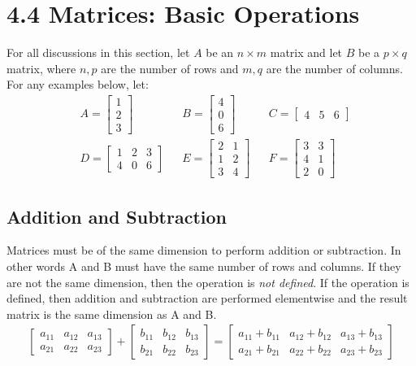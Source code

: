 \documentclass[14pt]{extarticle}
\begin{document}
\section*{4.4 Matrices: Basic Operations}
For all discussions in this section, let $A$ be an $n\times m$ matrix and let $B$ be a $p\times q$ matrix, where $n, p$ are the number of rows and $m, q$ are the number of columns. For any examples below, let:
\begin{align*}
	&A = \begin{bmatrix}
		1 \\
		2 \\
		3
	\end{bmatrix} &
	&B = \begin{bmatrix}
		4 \\
		0 \\
		6
	\end{bmatrix} &
	&C =\begin{bmatrix}
		4 & 5 & 6
	\end{bmatrix} \\
	&D = \begin{bmatrix}
		1 & 2 & 3 \\
		4 & 0 & 6
	\end{bmatrix} &
	&E = \begin{bmatrix}
		2 & 1 \\
		1 & 2 \\
		3 & 4
	\end{bmatrix} &
	&F = \begin{bmatrix}
		3 & 3 \\
		4 & 1 \\
		2 & 0
	\end{bmatrix}
\end{align*}

\subsection{Addition and Subtraction}
Matrices must be of the same dimension to perform addition or subtraction. In other words A and B must have the same number of rows and columns. If they are not the same dimension, then the operation is \textit{not defined}. If the operation is defined, then addition and subtraction are performed elementwise and the result matrix is the same dimension as A and B.
\begin{align*}
	\begin{bmatrix}
		a_{1 1} & a_{1 2} & a_{1 3} \\
		a_{2 1} & a_{2 2} & a_{2 3}
	\end{bmatrix} + 
	\begin{bmatrix}
		b_{1 1} & b_{1 2} & b_{1 3} \\
		b_{2 1} & b_{2 2} & b_{2 3}
	\end{bmatrix} = 
	\begin{bmatrix}
		a_{1 1}+b_{1 1} & a_{1 2}+b_{1 2} & a_{1 3}+b_{1 3} \\
		a_{2 1}+b_{2 1} & a_{2 2}+b_{2 2} & a_{2 3}+b_{2 3}
	\end{bmatrix}
\end{align*}
\end{document}
